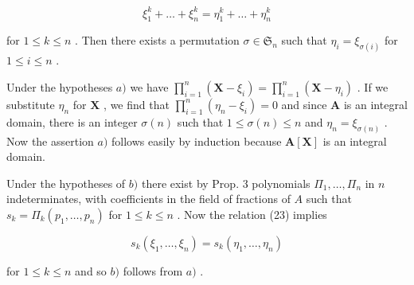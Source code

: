 \[
\xi_ {1} ^ {k} + \dots + \xi_ {n} ^ {k} = \eta_ {1} ^ {k} + \dots + \eta_ {n} ^ {k}\tag{23}
\]

for \(1 \leqslant k \leqslant n\) . Then there exists a permutation \(\sigma \in \mathfrak{S}_n\) such that \(\eta_i = \xi_{\sigma(i)}\) for \(1 \leqslant i \leqslant n\) .

Under the hypotheses \(a)\) we have \(\prod_{i=1}^{n} (\mathbf{X} - \xi_i) = \prod_{i=1}^{n} (\mathbf{X} - \eta_i)\) . If we substitute \(\eta_n\) for \(\mathbf{X}\) , we find that \(\prod_{i=1}^{n} (\eta_n - \xi_i) = 0\) and since \(\mathbf{A}\) is an integral domain, there is an integer \(\sigma(n)\) such that \(1 \leqslant \sigma(n) \leqslant n\) and \(\eta_n = \xi_{\sigma(n)}\) . Now the assertion \(a)\) follows easily by induction because \(\mathbf{A}[\mathbf{X}]\) is an integral domain.

Under the hypotheses of \(b)\) there exist by Prop. 3 polynomials \(\Pi_1, \ldots, \Pi_n\) in \(n\) indeterminates, with coefficients in the field of fractions of \(A\) such that \(s_k = \Pi_k(p_1, \ldots, p_n)\) for \(1 \leqslant k \leqslant n\) . Now the relation (23) implies

\[
s _ {k} (\xi_ {1}, \dots , \xi_ {n}) = s _ {k} (\eta_ {1}, \dots , \eta_ {n})
\]

for \(1 \leqslant k \leqslant n\) and so \(b)\) follows from \(a)\) .

